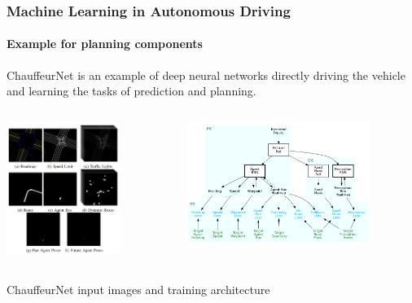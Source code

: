 \begin{frame}
\frametitle{Machine Learning in Autonomous Driving}
\framesubtitle{Example for planning components}
ChauffeurNet is an example of deep neural networks directly driving the vehicle
and learning the tasks of prediction and planning.\\
\begin{columns}[T]
    \begin{column}{0.4\textwidth}
        \centering
        \includegraphics[width=0.7\textwidth]{images/waymo_chauffeurnet_inputs.png}\\
    \end{column}
    \begin{column}{0.6\textwidth}
        \centering
        \includegraphics[width=0.8\textwidth]{images/waymo_chauffeurnet_network.png}\\
    \end{column}
\end{columns}
\vspace{0.2cm}
\centering
\footnotesize{ChauffeurNet input images and training architecture \cite{Bansal2019}}
\end{frame}

